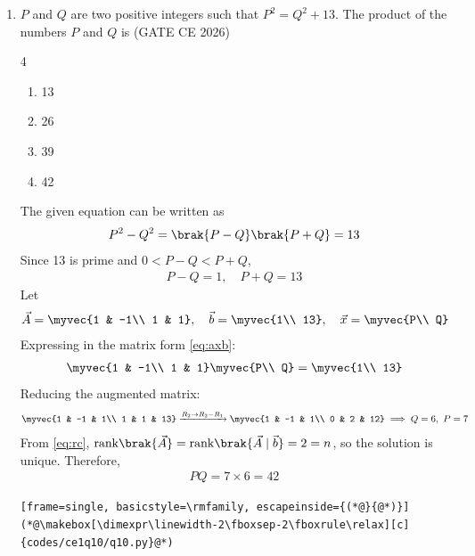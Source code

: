 \begin{enumerate}[label=\thesubsection.\arabic*, ref=\thesubsection.\theenumi, itemsep=0pt, leftmargin=*]
\begin{lstlisting}[frame=single, basicstyle=\rmfamily, escapeinside={(*@}{@*)}]
(*@\makebox[\dimexpr\linewidth-2\fboxsep-2\fboxrule\relax][c]{codes/ce1q9/q09.py}@*)
\end{lstlisting}
\item $P$ and $Q$ are two positive integers such that $P^2 = Q^2 + 13$. The product of the numbers $P$ and $Q$ is \underline{\hspace{2cm}} \hfill (GATE CE 2026)
\begin{multicols}{4}
\begin{enumerate}[label=\alph*), itemsep=0pt]
\item 13
\item 26
\item 39
\item 42
\end{enumerate}
\end{multicols}
\solution The given equation can be written as
\begin{align}
P^2 - Q^2 = \brak{P-Q}\brak{P+Q} = 13
\end{align}
Since 13 is prime and $0 < P - Q < P + Q$,
\begin{align}
P - Q = 1,\quad P + Q = 13
\end{align}
Let
\begin{align}
\vec{A} = \myvec{1 & -1\\ 1 & 1},\quad \vec{b} = \myvec{1\\ 13},\quad \vec{x} = \myvec{P\\ Q}
\end{align}
Expressing in the matrix form \eqref{eq:axb}:
\begin{align}
\myvec{1 & -1\\ 1 & 1}\myvec{P\\ Q} = \myvec{1\\ 13}
\end{align}
Reducing the augmented matrix:
\begin{align}
\myvec{1 & -1 & 1\\ 1 & 1 & 13} \xrightarrow{R_2\to R_2 - R_1} \myvec{1 & -1 & 1\\ 0 & 2 & 12} \implies Q = 6,\ P = 7
\end{align}
From \eqref{eq:rc}, $\text{rank}\brak{\vec{A}} = \text{rank}\brak{{\vec{A}\mid\vec{b}}} = 2 = n$, so the solution is unique. Therefore,
\begin{align}
PQ = 7\times 6 = 42
\end{align}
\begin{lstlisting}[frame=single, basicstyle=\rmfamily, escapeinside={(*@}{@*)}]
(*@\makebox[\dimexpr\linewidth-2\fboxsep-2\fboxrule\relax][c]{codes/ce1q10/q10.py}@*)
\end{lstlisting}



\end{enumerate}
